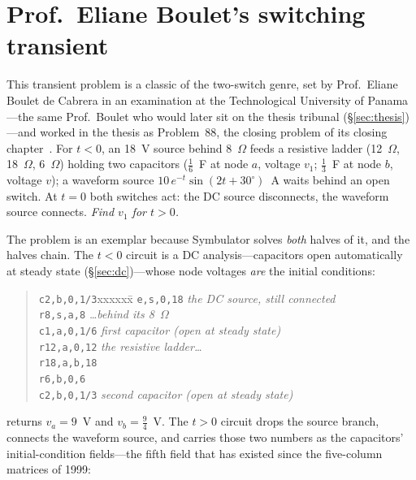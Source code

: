 \documentclass[11pt,oneside]{report}
\newcommand{\code}[1]{\texttt{#1}}
\begin{document}
\section{Prof.\ Eliane Boulet's switching transient}
\label{sec:boulet}

This transient problem is a classic of the two-switch genre, set by
Prof.\ Eliane Boulet de Cabrera in an examination at the
Technological University of Panama---the same Prof.\ Boulet who
would later sit on the thesis tribunal (\S\ref{sec:thesis})---and
worked in the thesis as Problem~88, the closing problem of its
closing chapter~\cite[\S12.3]{thesis2000}. For $t<0$, an 18~V source
behind 8~$\Omega$ feeds a resistive ladder (12~$\Omega$,
18~$\Omega$, 6~$\Omega$) holding two capacitors ($\tfrac16$~F at
node $a$, voltage $v_1$; $\tfrac13$~F at node $b$, voltage $v$); a
waveform source $10\,e^{-t}\sin(2t+30^{\circ})$~A waits behind an
open switch. At $t=0$ both switches act: the DC source disconnects,
the waveform source connects. \emph{Find $v_1$ for $t>0$.}

The problem is an exemplar because Symbulator solves \emph{both}
halves of it, and the halves chain. The $t<0$ circuit is a DC
analysis---capacitors open automatically at steady state
(\S\ref{sec:dc})---whose node voltages \emph{are} the initial
conditions:

\begin{quote}
\begin{tabbing}
\code{c2,b,0,1/3}xxxxxx\=\kill
\code{e,s,0,18}         \> \emph{the DC source, still connected} \\
\code{r8,s,a,8}         \> \emph{\ldots behind its 8~$\Omega$} \\
\code{c1,a,0,1/6}       \> \emph{first capacitor (open at steady state)} \\
\code{r12,a,0,12}       \> \emph{the resistive ladder\ldots} \\
\code{r18,a,b,18} \\
\code{r6,b,0,6} \\
\code{c2,b,0,1/3}       \> \emph{second capacitor (open at steady state)}
\end{tabbing}
\end{quote}

\noindent returns $v_a = 9$~V and $v_b = \tfrac94$~V. The $t>0$
circuit drops the source branch, connects the waveform source, and
carries those two numbers as the capacitors' initial-condition
fields---the fifth field that has existed since the five-column
matrices of 1999:
\end{document}
